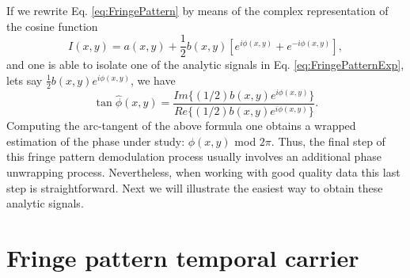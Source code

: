 If we rewrite Eq. \eqref{eq:FringePattern} by means of the complex representation of
the cosine function
\begin{equation}\label{eq:FringePatternExp}
 I(x,y)=a(x,y)+ \frac{1}{2} b(x,y)[e^{i \phi(x,y)} + e^{-i \phi(x,y)}],
\end{equation}
and one is able to isolate one of the analytic signals in Eq. 
\eqref{eq:FringePatternExp}, lets say $\frac{1}{2} b(x,y)e^{i \phi(x,y)}$, we have
\begin{equation}\label{eq:TanPhi}
 \tan \hat{\phi}(x,y)=\frac{Im\{(1/2)b(x,y)e^{i \phi(x,y)}\}}{Re\{(1/2)b(x,y)
e^{i \phi(x,y)}\}}.
\end{equation}
Computing the arc-tangent of the above formula one obtains a wrapped estimation of
the phase under study: $\phi(x,y)$ mod $2\pi$. Thus, the final step of this fringe
pattern demodulation process usually involves an additional phase unwrapping 
process. Nevertheless, when working with good quality data this last step is 
straightforward. Next we will illustrate the easiest way to obtain these analytic 
signals.

\section{Fringe pattern temporal carrier}

